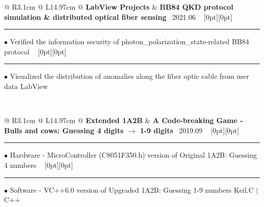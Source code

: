 {{\begin{tabularx}{\linewidth}{@{} R{3.1cm} @{\phantom{d}} L{14.97cm} @{}}
	\textbf{LabView Projects} & \hspace{10pt} \textbf{BB84 QKD protocol simulation \& distributed optical fiber sensing} \hfill \textendash\ 2021.06 \newline \vspace{2pt} \ \hspace{-3pt} \raisebox{0.09\height}[0pt][0pt]{\vrule width0.5pt height30.0pt} \hspace{-0.26em}\rule[0.25em]{1.0em}{0.5pt}\!\! $\bullet$ {\small Verified the information security of photon\_polarization\_state-related BB84 protocol} \hfill \href{https://github.com/ChenZhu-Xie/postgraduate_courses/tree/master/3__2.2__Engineering_Course/2__2.2__Information_Technology_\%E2\%86\%90_RoamEdit\%2BLabView__1.0_year/\%E6\%88\%91\%E7\%9A\%84\%E8\%AF\%BE\%E8\%AE\%BE}{\color{black!50}\faGithub} \newline \vspace{-3pt} \ \hspace{-3pt} \raisebox{0.18\height}[0pt][0pt]{\vrule width0.5pt height15.0pt} \hspace{-0.26em}\rule[0.25em]{1.0em}{0.5pt}\!\! $\bullet$ {\small Visualized the distribution of anomalies along the fiber optic cable from user data} \hfill {\small \color{color-detail} LabView} \href{https://github.com/ChenZhu-Xie/postgraduate_courses/tree/master/3__2.2__Engineering_Course/3__2.3__Labview__1.0_year/\%E8\%99\%9A\%E6\%8B\%9F\%E4\%BB\%AA\%E5\%99\%A82021\%E8\%AF\%BE\%E8\%AE\%BE_\%E9\%80\%89\%E9\%A2\%98\%E4\%B8\%80_\%E8\%B0\%A2\%E5\%B0\%98\%E7\%AB\%B9}{\color{black!50}\faGithub} \\ \Gap\Gap\Gap
\end{tabularx}
\\
\begin{tabularx}{\linewidth}{@{} R{3.1cm} @{\phantom{d}} L{14.97cm} @{}}
	\textbf{Extended 1A2B} & \hspace{10pt} \textbf{A Code-breaking Game - Bulls and cows: Guessing 4 digits $\to$ 1-9 digits} \hfill \textendash\ 2019.09 \newline \vspace{2pt} \ \hspace{-3pt} \raisebox{0.09\height}[0pt][0pt]{\vrule width0.5pt height30.0pt} \hspace{-0.26em}\rule[0.25em]{1.0em}{0.5pt}\!\! $\bullet$ {\small Hardware - MicroController (C8051F350.h) version of Original 1A2B: Guessing 4 numbers} \newline \vspace{-3pt} \ \hspace{-3pt} \raisebox{0.18\height}[0pt][0pt]{\vrule width0.5pt height15.0pt} \hspace{-0.26em}\rule[0.25em]{1.0em}{0.5pt}\!\! $\bullet$ {\small Software - VC++6.0 version of Upgraded 1A2B: Guessing 1-9 numbers} \hfill {\small \color{color-detail} Keil.C $|$ C++} \href{https://youtu.be/BiX5CQXVdPY}{\raisebox{-0.05\height}{\color{youtube_red!50}\faYoutube}} \href{https://github.com/ChenZhu-Xie/1A2B_3C_4A5B}{\color{black!50}\faGithub} \\ \Gap\Gap\Gap

\end{tabularx}}}
